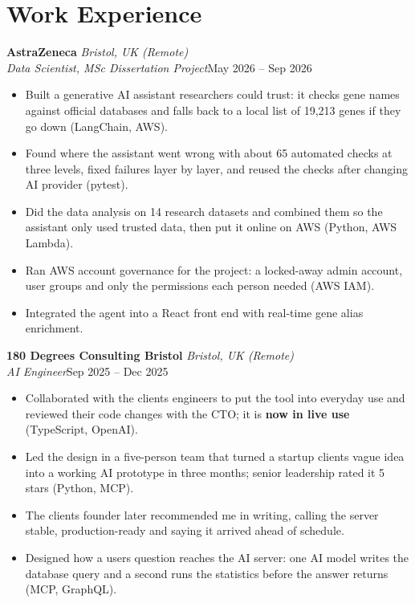 \documentclass[a4paper,11pt]{article}
\newcommand{\role}[4]{%
  \textbf{#1}{\color{muted}\,\textperiodcentered\,\textit{#2}}\\
  \textit{#4}\hfill{\color{muted}#3}\par}
\newcommand{\gap}{\vspace{5pt}}
\newcommand{\num}[1]{\textbf{#1}}   %
\begin{document}
\section{Work Experience}
\role{AstraZeneca}{Bristol, UK (Remote)}{May 2026 – Sep 2026}{Data Scientist, MSc Dissertation Project}
\begin{itemize}
  \item Built a generative AI assistant researchers could trust: it checks gene names against official databases and falls back to a local list of 19,213 genes if they go down (LangChain, AWS).
  \item Found where the assistant went wrong with about 65 automated checks at three levels, fixed failures layer by layer, and reused the checks after changing AI provider (pytest).
  \item Did the data analysis on 14 research datasets and combined them so the assistant only used trusted data, then put it online on AWS (Python, AWS Lambda).
  \item Ran AWS account governance for the project: a locked-away admin account, user groups and only the permissions each person needed (AWS IAM).
  \item Integrated the agent into a React front end with real-time gene alias enrichment.
\end{itemize}
\gap
{}
\role{180 Degrees Consulting Bristol}{Bristol, UK (Remote)}{Sep 2025 – Dec 2025}{AI Engineer}
\begin{itemize}
  \item Collaborated with the client\textquotesingle{}s engineers to put the tool into everyday use and reviewed their code changes with the CTO; it is \num{now in live use} (TypeScript, OpenAI).
  \item Led the design in a five-person team that turned a startup client\textquotesingle{}s vague idea into a working AI prototype in three months; senior leadership rated it 5 stars (Python, MCP).
  \item The client\textquotesingle{}s founder later recommended me in writing, calling the server \textquotesingle{}stable, production-ready\textquotesingle{} and saying it arrived ahead of schedule.
  \item Designed how a user\textquotesingle{}s question reaches the AI server: one AI model writes the database query and a second runs the statistics before the answer returns (MCP, GraphQL).
\end{itemize}
\end{document}
